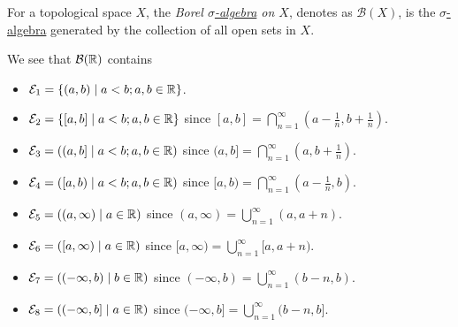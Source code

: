 \begin{definition}
	For a topological space \(X\), the \emph{Borel \hyperref[def:sigma-algebra]{\(\sigma\)-algebra} on \(X\)}, denotes as \(\mathcal{B}(X)\),
	is the \hyperref[def:sigma-algebra]{\(\sigma\)-algebra} generated by the collection of all open sets in \(X\).
\end{definition}

\begin{eg}
	We see that \(\mathcal{B} (\mathbb{\MakeUppercase{R}} )\) contains
	\begin{itemize}
		\item \(\mathcal{E}_1 = \left\{(a, b) \mid a < b; a, b\in \mathbb{\MakeUppercase{R}} \right\}\).
		\item \(\mathcal{E}_2 = \left\{[a, b] \mid a < b; a, b\in \mathbb{\MakeUppercase{R}} \right\}\) since \([a, b] = \bigcap\limits_{n=1}^{\infty} (a - \frac{1}{n}, b + \frac{1}{n})\).
		\item \(\mathcal{E}_3 = \left((a, b]  \mid a < b; a, b\in \mathbb{\MakeUppercase{R}} \right)\) since \((a, b] = \bigcap\limits_{n=1}^{\infty} (a, b + \frac{1}{n})\).
		\item \(\mathcal{E}_4 = \left([a, b)  \mid a < b; a, b\in \mathbb{\MakeUppercase{R}} \right)\) since \([a, b) = \bigcap\limits_{n=1}^{\infty} (a - \frac{1}{n}, b)\).
		\item \(\mathcal{E}_5 = \left((a, \infty)  \mid a\in \mathbb{\MakeUppercase{R}} \right)\) since \((a, \infty) = \bigcup\limits_{n=1}^{\infty} (a , a + n)\).
		\item \(\mathcal{E}_6 = \left([a, \infty)  \mid a\in \mathbb{\MakeUppercase{R}} \right)\) since \([a, \infty) = \bigcup\limits_{n=1}^{\infty} [a , a + n)\).
		\item \(\mathcal{E}_7 = \left((-\infty, b) \mid b\in \mathbb{\MakeUppercase{R}} \right)\) since \((-\infty, b) = \bigcup\limits_{n=1}^{\infty} (b - n, b)\).
		\item \(\mathcal{E}_8 = \left((-\infty, b] \mid a\in \mathbb{\MakeUppercase{R}} \right)\) since \((-\infty, b] = \bigcup\limits_{n=1}^{\infty} (b - n, b]\).
	\end{itemize}
\end{eg}

